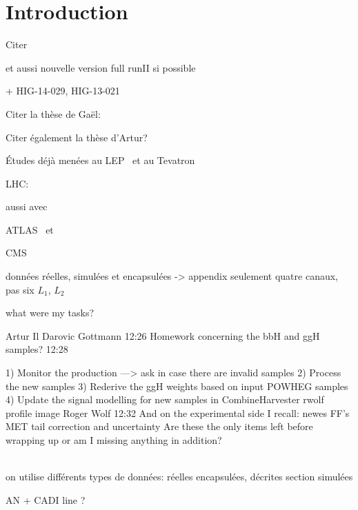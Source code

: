 \section{Introduction}\label{chapter-HTT_analysis-section-introduction}

Citer 

et aussi nouvelle version full runII si possible

+ HIG-14-029, HIG-13-021


Citer la thèse de Gaël:\\

Citer également la thèse d'Artur?\\


Études déjà menées au LEP~\cite{Schael:2006cr} et au Tevatron~\cite{Aaltonen:2009vf,Abazov:2011jh}

LHC: \cite{CMS-PAS-HIG-13-021,CMS-PAS-HIG-14-029,CMS-PAS-HIG-17-020}

aussi avec \quarkb\antiquarkb~\cite{Chatrchyan:2013qga,Khachatryan:2015tra}

ATLAS \mu\mu\ et \tau\tau~\cite{Aad:2012cfr,ATLAS-MSSM-HTT_2018,ATLAS-MSSM-HTT_2020}

CMS \mu\mu~\cite{CMS:2015ooa} \tau\tau~\cite{Chatrchyan:2012vp,CMS-MSSM-HTT_2014,CMS-PAS-HIG-17-020}


données réelles, simulées et encapsulées  -> appendix
seulement quatre canaux, pas six
$L_1$, $L_2$

what were my tasks?

	
Artur Il Darovic Gottmann
12:26
Homework concerning the bbH and ggH samples?
12:28




1) Monitor the production ---> ask in case there are invalid samples
2) Process the new samples
3) Rederive the ggH weights based on input POWHEG samples
4) Update the signal modelling for new samples in CombineHarvester
rwolf profile image	
Roger Wolf
12:32
And on the experimental side I recall:
newes FF's
MET tail correction and uncertainty
Are these the only items left before wrapping up or am I missing anything in addition?

\\
on utilise différents types de données:
réelles
encapsulées, décrites section
simulées

AN + CADI line ?
